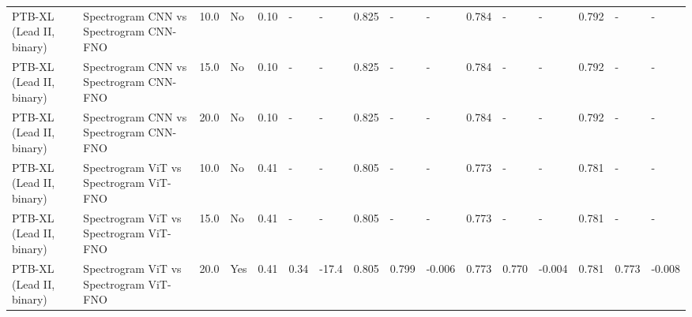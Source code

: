 \begin{longtable}{llllllllllllllll}
PTB-XL (Lead II, binary) & Spectrogram CNN vs Spectrogram CNN-FNO & 10.0 & No & 0.10 & - & - & 0.825 & - & - & 0.784 & - & - & 0.792 & - & - \\
PTB-XL (Lead II, binary) & Spectrogram CNN vs Spectrogram CNN-FNO & 15.0 & No & 0.10 & - & - & 0.825 & - & - & 0.784 & - & - & 0.792 & - & - \\
PTB-XL (Lead II, binary) & Spectrogram CNN vs Spectrogram CNN-FNO & 20.0 & No & 0.10 & - & - & 0.825 & - & - & 0.784 & - & - & 0.792 & - & - \\
PTB-XL (Lead II, binary) & Spectrogram ViT vs Spectrogram ViT-FNO & 10.0 & No & 0.41 & - & - & 0.805 & - & - & 0.773 & - & - & 0.781 & - & - \\
PTB-XL (Lead II, binary) & Spectrogram ViT vs Spectrogram ViT-FNO & 15.0 & No & 0.41 & - & - & 0.805 & - & - & 0.773 & - & - & 0.781 & - & - \\
PTB-XL (Lead II, binary) & Spectrogram ViT vs Spectrogram ViT-FNO & 20.0 & Yes & 0.41 & 0.34 & -17.4 & 0.805 & 0.799 & -0.006 & 0.773 & 0.770 & -0.004 & 0.781 & 0.773 & -0.008 \\
\end{longtable}
